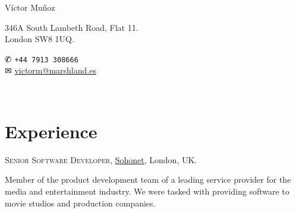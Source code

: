 \documentclass[11pt]{article}
\newcommand{\years}[1]{\marginnote{\scriptsize #1}}
\begin{document}
\begin{minipage}[m]{.3\textwidth}
	{\LARGE Víctor Muñoz}
\end{minipage}
\begin{minipage}[m]{.45\textwidth}
	346A South Lambeth Road, Flat 11.\\
	London SW8 1UQ.
\end{minipage}
\begin{minipage}[m]{.25\textwidth}
	{\dingbats ✆} \texttt{+44 7913 308666}\\
	{\dingbats ✉} \href{mailto:victorm@marshland.es}
	                    {victorm@marshland.es}
\end{minipage}\\[.05cm]


\section*{Experience}  %
\noindent

\years{2018--2020}\textsc{Senior Software Developer}, \href{https://sohonet.com}{Sohonet}, London, UK.

Member of the product development team of a leading service provider for the media and entertainment industry. We were tasked with providing software to movie studios and production companies.
\end{document}
